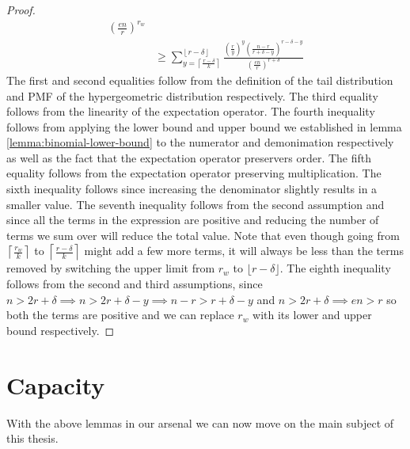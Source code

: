 \begin{proof}
\begin{equation}
\begin{split}
{                            }
                            {
                                \left(\frac{en}{r}\right)^{r_w}
                            }
                \\[2em] &\ge 
                            \sum_{y = \left\lceil \frac{r-\delta}{k} \right\rceil}^{\left\lfloor r-\delta \right\rfloor}
                                \frac
                                {
                                    \left(\frac{r}{y}\right)^{y} \left(\frac{n-r}{r + \delta - y}\right)^{r-\delta-y}
                                }
                                {
                                    \left(\frac{en}{r}\right)^{r+\delta}
                                } 
            \end{split}
        \end{equation}
        The first and second equalities follow from the definition of the tail distribution and PMF of the hypergeometric distribution respectively. The third equality follows from the linearity of the expectation operator. The fourth inequality follows from applying the lower bound and upper bound we established in lemma \ref{lemma:binomial-lower-bound} to the numerator and demonimation respectively as well as the fact that the expectation operator preservers order. The fifth equality follows from the expectation operator preserving multiplication. The sixth inequality follows since increasing the denominator slightly results in a smaller value. The seventh inequality follows from the second assumption and since all the terms in the expression are positive and reducing the number of terms we sum over will reduce the total value. Note that even though going from $\left\lceil \frac{r_w}{k} \right\rceil$ to $\left\lceil \frac{r-\delta}{k} \right\rceil$ might add a few more terms, it will always be less than the terms removed by switching the upper limit from $r_w$ to $\lfloor r-\delta \rfloor$. The eighth inequality follows from the second and third assumptions, since $n > 2r + \delta \implies n > 2r + \delta - y \implies n - r > r + \delta - y$ and $n > 2r + \delta \implies en > r$ so both the terms are positive and we can replace $r_w$ with its lower and upper bound respectively. 
    \end{proof}

    \section{Capacity}
    With the above lemmas in our arsenal we can now move on  the main subject of this thesis. 









